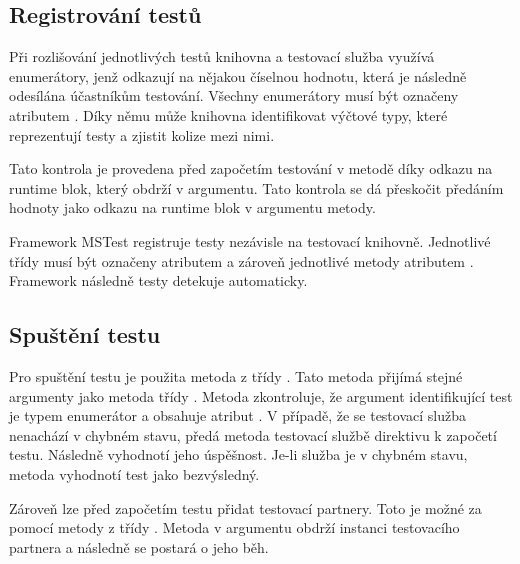 \subsection{Registrování testů}\label{sec:reg_test_impl}

Při rozlišování jednotlivých testů knihovna a testovací služba využívá enumerátory, jenž odkazují na nějakou číselnou hodnotu, která je následně odesílána účastníkům testování. Všechny enumerátory musí být označeny atributem . Díky němu může knihovna identifikovat výčtové typy, které reprezentují testy a zjistit kolize mezi nimi. 

Tato kontrola je provedena před započetím testování v metodě  díky odkazu na runtime blok, který obdrží v argumentu. Tato kontrola se dá přeskočit předáním hodnoty  jako odkazu na runtime blok v argumentu metody.

Framework MSTest registruje testy nezávisle na testovací knihovně. Jednotlivé třídy musí být označeny atributem  a zároveň jednotlivé metody atributem . Framework následně testy detekuje automaticky.

\subsection{Spuštění testu}
Pro spuštění testu je použita metoda  z třídy . Tato metoda přijímá stejné argumenty jako metoda  třídy . Metoda zkontroluje, že argument identifikující test je typem enumerátor a obsahuje atribut . V případě, že se testovací služba nenachází v chybném stavu, předá metoda testovací službě direktivu k započetí testu. Následně vyhodnotí jeho úspěšnost. Je-li služba je v chybném stavu, metoda vyhodnotí test jako bezvýsledný.

Zároveň lze před započetím testu přidat testovací partnery. Toto je možné za pomocí metody  z třídy . Metoda v argumentu obdrží instanci testovacího partnera a následně se postará o jeho běh.

